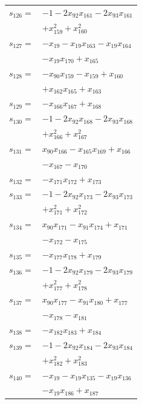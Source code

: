 \begin{longtable}{@{}r@{\;}l@{}}
\(s_{126}=\) & \(\displaystyle -1 -2x_{92}x_{161} -2x_{93}x_{161}\) \\
 & \(\displaystyle +x_{159}^{2} +x_{160}^{2}\) \\[3pt]
\(s_{127}=\) & \(\displaystyle -x_{19} -x_{19}x_{163} -x_{19}x_{164}\) \\
 & \(\displaystyle -x_{19}x_{170} +x_{165}\) \\[3pt]
\(s_{128}=\) & \(\displaystyle -x_{90}x_{159} -x_{159} +x_{160}\) \\
 & \(\displaystyle +x_{162}x_{165} +x_{163}\) \\[3pt]
\(s_{129}=\) & \(\displaystyle -x_{166}x_{167} +x_{168}\) \\[3pt]
\(s_{130}=\) & \(\displaystyle -1 -2x_{92}x_{168} -2x_{93}x_{168}\) \\
 & \(\displaystyle +x_{166}^{2} +x_{167}^{2}\) \\[3pt]
\(s_{131}=\) & \(\displaystyle x_{90}x_{166} -x_{165}x_{169} +x_{166}\) \\
 & \(\displaystyle -x_{167} -x_{170}\) \\[3pt]
\(s_{132}=\) & \(\displaystyle -x_{171}x_{172} +x_{173}\) \\[3pt]
\(s_{133}=\) & \(\displaystyle -1 -2x_{92}x_{173} -2x_{93}x_{173}\) \\
 & \(\displaystyle +x_{171}^{2} +x_{172}^{2}\) \\[3pt]
\(s_{134}=\) & \(\displaystyle x_{90}x_{171} -x_{91}x_{174} +x_{171}\) \\
 & \(\displaystyle -x_{172} -x_{175}\) \\[3pt]
\(s_{135}=\) & \(\displaystyle -x_{177}x_{178} +x_{179}\) \\[3pt]
\(s_{136}=\) & \(\displaystyle -1 -2x_{92}x_{179} -2x_{93}x_{179}\) \\
 & \(\displaystyle +x_{177}^{2} +x_{178}^{2}\) \\[3pt]
\(s_{137}=\) & \(\displaystyle x_{90}x_{177} -x_{91}x_{180} +x_{177}\) \\
 & \(\displaystyle -x_{178} -x_{181}\) \\[3pt]
\(s_{138}=\) & \(\displaystyle -x_{182}x_{183} +x_{184}\) \\[3pt]
\(s_{139}=\) & \(\displaystyle -1 -2x_{92}x_{184} -2x_{93}x_{184}\) \\
 & \(\displaystyle +x_{182}^{2} +x_{183}^{2}\) \\[3pt]
\(s_{140}=\) & \(\displaystyle -x_{19} -x_{19}x_{135} -x_{19}x_{136}\) \\
 & \(\displaystyle -x_{19}x_{186} +x_{187}\) \\[3pt]

\end{longtable}
